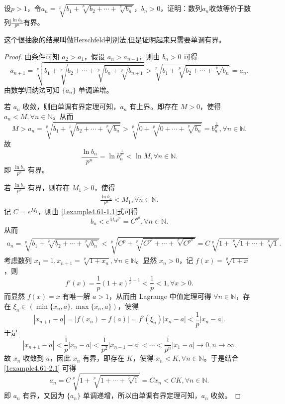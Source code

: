 \documentclass[../../main.tex]{subfiles}%
\begin{document}
\begin{example}[$\,\,$Herschfeld判别法]\label{example:Herschfeld判别法}
设\(p > 1\)，令\(a_n=\sqrt[p]{b_1 + \sqrt[p]{b_2+\cdots+\sqrt[p]{b_n}}}\)，\(b_n>0\)，证明：数列\(a_n\)收敛等价于数列\(\frac{\ln b_n}{p^n}\)有界。
\end{example}
\begin{remark}
这个很抽象的结果叫做Herschfeld判别法,但是证明起来只需要单调有界。
\end{remark}
\begin{proof}

由条件可知 \(a_2 > a_1\)，假设 \(a_n > a_{n - 1}\)，则由 \(b_n > 0\) 可得
\[
a_{n + 1}=\sqrt[p]{b_1+\sqrt[p]{b_2+\cdots +\sqrt[p]{b_n+\sqrt[p]{b_{n + 1}}}}}>\sqrt[p]{b_1+\sqrt[p]{b_2+\cdots +\sqrt[p]{b_n}}}=a_n.
\]
由数学归纳法可知 \(\{ a_n \}\) 单调递增。

若 \(a_n\) 收敛，则由单调有界定理可知，\(a_n\) 有上界。即存在 \(M > 0\)，使得 \(a_n < M,\forall n\in \mathbb{N}\)。从而
\[
M > a_n=\sqrt[p]{b_1+\sqrt[p]{b_2+\cdots +\sqrt[p]{b_n}}}>\sqrt[p]{0+\sqrt[p]{0+\cdots +\sqrt[p]{b_n}}}=b_n^{\frac{1}{p^n}},\forall n\in \mathbb{N}.
\]
故
\[
\frac{\ln b_n}{p^n}=\ln b_n^{\frac{1}{p^n}}<\ln M,\forall n\in \mathbb{N}.
\]
即 \(\frac{\ln b_n}{p^n}\) 有界。

若 \(\frac{\ln b_n}{p^n}\) 有界，则存在 \(M_1 > 0\)，使得
\begin{align}
\frac{\ln b_n}{p^n}<M_1,\forall n\in \mathbb{N}. \label{1example4.61-1.1}
\end{align}
记 \(C = e^{M_1}\)，则由 \eqref{1example4.61-1.1}式可得
\[
b_n<e^{M_1p^n}=C^{p^n},\forall n\in \mathbb{N}.
\]
从而
\begin{align}
a_n=\sqrt[p]{b_1+\sqrt[p]{b_2+\cdots +\sqrt[p]{b_n}}}<\sqrt[p]{C^p+\sqrt[p]{C^{p^2}+\cdots +\sqrt[p]{C^{p^n}}}}=C\sqrt[p]{1+\sqrt[p]{1+\cdots +\sqrt[p]{1}}}. \label{1example4.61-2.1}
\end{align}
考虑数列 \(x_1 = 1,x_{n + 1}=\sqrt[p]{1 + x_n},\forall n\in \mathbb{N}\)。显然 \(x_n > 0\)，记 \(f(x)=\sqrt[p]{1 + x}\)，则
\[
f'(x)=\frac{1}{p}(1 + x)^{\frac{1}{p}-1}<\frac{1}{p}<1,\forall x > 0.
\]
而显然 \(f(x)=x\) 有唯一解 \(a > 1\)，从而由 Lagrange 中值定理可得 \(\forall n\in \mathbb{N}\)，存在 \(\xi_n\in(\min\{ x_n,a \},\max\{ x_n,a \})\)，使得
\[
|x_{n + 1}-a|=|f(x_n)-f(a)|=f'(\xi_n)|x_n - a|<\frac{1}{p}|x_n - a|.
\]
于是
\[
|x_{n + 1}-a|<\frac{1}{p}|x_n - a|<\frac{1}{p^2}|x_{n - 1}-a|<\cdots <\frac{1}{p^n}|x_1 - a|\rightarrow 0,n\rightarrow\infty.
\]
故 \(x_n\) 收敛到 \(a\)，因此 \(x_n\) 有界，即存在 \(K\)，使得 \(x_n < K,\forall n\in \mathbb{N}\)。于是结合 \eqref{1example4.61-2.1} 可得
\[
a_n=C\sqrt[p]{1+\sqrt[p]{1+\cdots +\sqrt[p]{1}}}=Cx_n<CK,\forall n\in \mathbb{N}.
\]
即 \(a_n\) 有界，又因为 \(\{ a_n \}\) 单调递增，所以由单调有界定理可知，\(a_n\) 收敛。

\end{proof}
\end{document}

